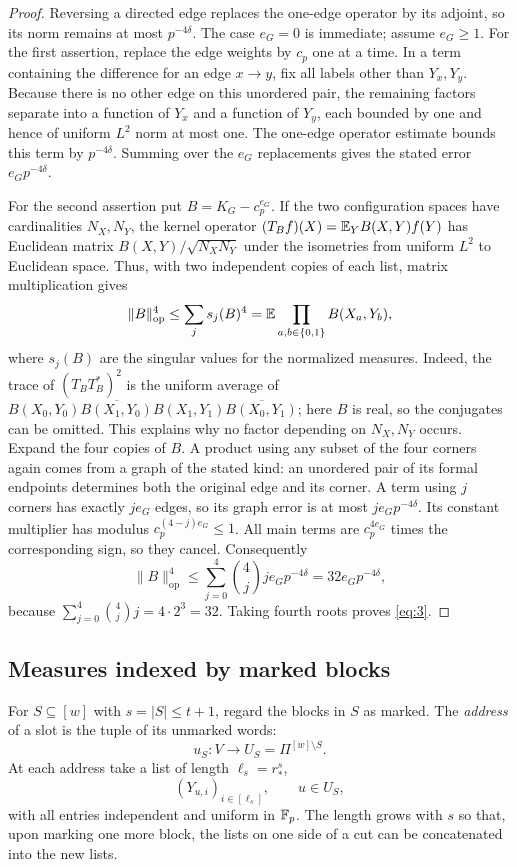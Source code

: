 \begin{proof}
Reversing a directed edge replaces the one-edge operator by its adjoint,
so its norm remains at most $p^{-4\delta}$.  The case $e_G=0$ is
immediate; assume $e_G\ge1$.
For the first assertion, replace the edge weights by $c_p$ one at a
time.  In a term containing the difference for an edge $x\to y$, fix
all labels other than $Y_x,Y_y$.  Because there is no other edge on
this unordered pair, the remaining factors separate into a function
of $Y_x$ and a function of $Y_y$, each bounded by one and hence of
uniform $L^2$ norm at most one.  The one-edge operator estimate bounds
this term by $p^{-4\delta}$.  Summing over the $e_G$ replacements gives
the stated error $e_Gp^{-4\delta}$.

For the second assertion put $B=K_G-c_p^{e_G}$.  If the two configuration
spaces have cardinalities $N_X,N_Y$, the kernel operator
$(T_Bf)(X)=\mathbb E_Y B(X,Y)f(Y)$ has Euclidean matrix
$B(X,Y)/\sqrt{N_XN_Y}$ under the isometries from uniform $L^2$ to
Euclidean space.  Thus, with two independent copies of each list,
matrix multiplication gives
\[
 \|B\|_{\mathrm{op}}^4
 \le \sum_j s_j(B)^4
 =\mathbb E\prod_{a,b\in\{0,1\}}B(X_a,Y_b),
\]
where $s_j(B)$ are the singular values for the normalized measures.
Indeed, the trace of $(T_BT_B^*)^2$ is the uniform average of
$B(X_0,Y_0)\overline{B(X_1,Y_0)}B(X_1,Y_1)\overline{B(X_0,Y_1)}$;
here $B$ is real, so the conjugates can be omitted.  This explains why
no factor depending on $N_X,N_Y$ occurs.
Expand the four copies of $B$.  A product using any subset of the four
corners again comes from a graph of the stated kind: an unordered pair
of its formal endpoints determines both the original edge and its
corner.  A term using $j$ corners has exactly $je_G$ edges, so its graph
error is at most $je_Gp^{-4\delta}$.  Its constant multiplier has
modulus $c_p^{(4-j)e_G}\le1$.  All main terms are $c_p^{4e_G}$ times
the corresponding sign, so they cancel.  Consequently
\[
 \|B\|_{\mathrm{op}}^4
 \le\sum_{j=0}^4\binom4j je_Gp^{-4\delta}
 =32e_Gp^{-4\delta},
\]
because $\sum_{j=0}^4\binom4j j=4\cdot2^3=32$.  Taking fourth roots
proves \eqref{eq:3}.
\end{proof}

\subsection{Measures indexed by marked blocks}

For $S\subseteq[w]$ with $s=|S|\le t+1$, regard the blocks in $S$ as
marked.  The \emph{address} of a slot is the tuple of its unmarked
words:
\[
 u_S:V\longrightarrow U_S=\Pi^{[w]\setminus S}.
\]
At each address take a list of length $\ell_s=r_*^s$,
\[
 (Y_{u,i})_{i\in[\ell_s]},\qquad u\in U_S,
\]
with all entries independent and uniform in $\mathbb F_p$.  The length grows
with $s$ so that, upon marking one more block, the lists on one side
of a cut can be concatenated into the new lists.


